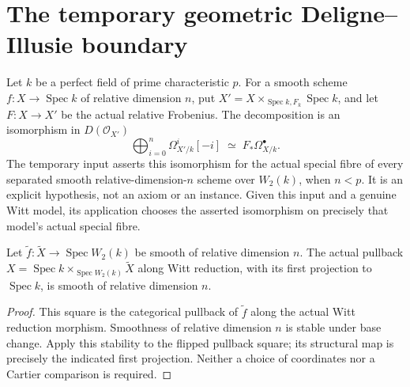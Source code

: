 \section{The temporary geometric Deligne--Illusie boundary}



\begin{definition}
\label{def:kn-geometric-di-input}
\leanok
{}
Let $k$ be a perfect field of prime characteristic $p$.  For a smooth
scheme $f:X\to\operatorname{Spec}k$ of relative dimension $n$, put
$X'=X\times_{\operatorname{Spec}k,F_k}\operatorname{Spec}k$, and let
$F:X\to X'$ be the actual relative Frobenius.  The decomposition is an
isomorphism in $D(\mathcal O_{X'})$
\[
 \bigoplus_{i=0}^{n}\Omega_{X'/k}^{i}[-i]
 \;\simeq\;F_*\Omega_{X/k}^{\bullet}.
\]
The temporary input asserts this isomorphism for the actual special
fibre of every separated smooth relative-dimension-$n$ scheme over $W_2(k)$,
when $n<p$.  It is an explicit hypothesis, not an axiom or an instance.
Given this input and a genuine Witt model, its application chooses the
asserted isomorphism on precisely that model's actual special fibre.
\end{definition}

\begin{lemma}
\label{lem:kn-witt-special-fibre-dimension}
\leanok
Let $\widetilde f:\widetilde X\to\operatorname{Spec}W_2(k)$ be
smooth of relative dimension $n$.  The actual pullback
$X=\operatorname{Spec}k\times_{\operatorname{Spec}W_2(k)}\widetilde X$
along Witt reduction, with its first projection to $\operatorname{Spec}k$,
is smooth of relative dimension $n$.
\end{lemma}
\begin{proof}
This square is the categorical pullback of $\widetilde f$ along the
actual Witt reduction morphism.  Smoothness of relative dimension $n$
is stable under base change.  Apply this stability to the flipped
pullback square; its structural map is precisely the indicated first
projection.  Neither a choice of coordinates nor a Cartier comparison
is required.
\end{proof}

